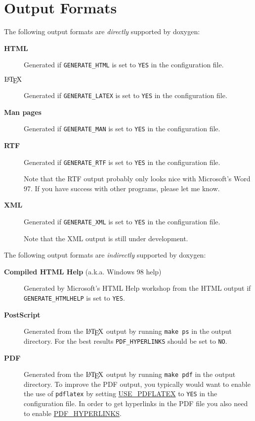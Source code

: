 \hypertarget{output_output}{}\section{Output Formats}\label{output_output}

The following output formats are {\em directly\/} supported by doxygen: \begin{description}
\item[{\bf HTML} ]Generated if {\tt GENERATE\_\-HTML} is set to {\tt YES} in the configuration file. \item[$\mbox{\LaTeX}$ ]Generated if {\tt GENERATE\_\-LATEX} is set to {\tt YES} in the configuration file. \item[{\bf Man pages} ]Generated if {\tt GENERATE\_\-MAN} is set to {\tt YES} in the configuration file. \item[{\bf RTF} ]Generated if {\tt GENERATE\_\-RTF} is set to {\tt YES} in the configuration file.

Note that the RTF output probably only looks nice with Microsoft's Word 97. If you have success with other programs, please let me know. \item[{\bf XML} ]Generated if {\tt GENERATE\_\-XML} is set to {\tt YES} in the configuration file.

Note that the XML output is still under development. \end{description}


The following output formats are {\em indirectly\/} supported by doxygen: \begin{description}
\item[{\bf Compiled HTML Help} (a.k.a. Windows 98 help) ]Generated by Microsoft's HTML Help workshop from the HTML output if {\tt GENERATE\_\-HTMLHELP} is set to {\tt YES}. \item[{\bf PostScript} ]Generated from the $\mbox{\LaTeX}$ output by running {\tt make ps} in the output directory. For the best results {\tt PDF\_\-HYPERLINKS} should be set to {\tt NO}. \item[{\bf PDF} ]Generated from the $\mbox{\LaTeX}$ output by running {\tt make pdf} in the output directory. To improve the PDF output, you typically would want to enable the use of {\tt pdflatex} by setting \hyperlink{config_cfg_use_pdflatex}{USE\_\-PDFLATEX} to {\tt YES} in the configuration file. In order to get hyperlinks in the PDF file you also need to enable \hyperlink{config_cfg_pdf_hyperlinks}{PDF\_\-HYPERLINKS}. \end{description}
